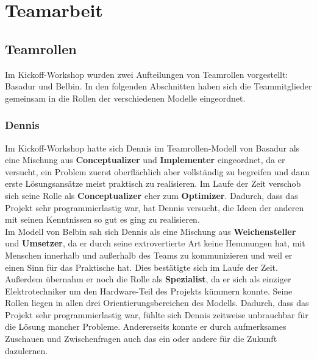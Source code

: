 \documentclass[a4paper,12pt,headsepline]{scrartcl}
\begin{document}

	\newpage
	\section{Teamarbeit}
	
	\subsection{Teamrollen}
		Im Kickoff-Workshop wurden zwei Aufteilungen von Teamrollen vorgestellt: Basadur und Belbin. In den folgenden Abschnitten haben sich die Teammitglieder gemeinsam in die Rollen der verschiedenen Modelle eingeordnet.
	\subsubsection{Dennis}
Im Kickoff-Workshop hatte sich Dennis im Teamrollen-Modell von Basadur als eine Mischung aus \textbf{Conceptualizer} und \textbf{Implementer} eingeordnet, da er versucht, ein Problem zuerst oberflächlich aber vollständig zu begreifen und dann erste Lösungsansätze meist praktisch zu realisieren. Im Laufe der Zeit verschob sich seine Rolle als \textbf{Conceptualizer} eher zum \textbf{Optimizer}. Dadurch, dass das Projekt sehr programmierlastig war, hat Dennis versucht, die Ideen der anderen mit seinen Kenntnissen so gut es ging zu realisieren.\\
Im Modell von Belbin sah sich Dennis als eine Mischung aus \textbf{Weichensteller} und \textbf{Umsetzer}, da er durch seine extrovertierte Art keine Hemmungen hat, mit Menschen innerhalb und außerhalb des Teams zu kommunizieren und weil er einen Sinn für das Praktische hat. Dies bestätigte sich im Laufe der Zeit. Außerdem übernahm er noch die Rolle als \textbf{Spezialist}, da er sich als einziger Elektrotechniker um den Hardware-Teil des Projekts kümmern konnte. Seine Rollen liegen in allen drei Orientierungsbereichen des Modells. Dadurch, dass das Projekt sehr programmierlastig war, fühlte sich Dennis zeitweise unbrauchbar für die Lösung mancher Probleme. Andererseits konnte er durch aufmerksames Zuschauen und Zwischenfragen auch das ein oder andere für die Zukunft dazulernen.
\end{document}
